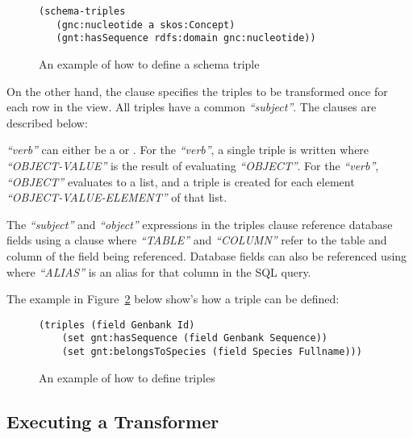 \begin{figure}[H]
\centering
\begin{verbatim}
(schema-triples
   (gnc:nucleotide a skos:Concept)
   (gnt:hasSequence rdfs:domain gnc:nucleotide))
\end{verbatim}
\caption{An example of how to define a schema triple}\label{code:schema-triples-example}
\end{figure}

On the other hand, the  clause specifies the triples to be transformed once for each row in the view.  All triples have a common \textit{``subject''}.  The  clauses are described below:

\textit{``verb''} can either be a  or .  For the  \textit{``verb''}, a single triple  is written where \textit{``OBJECT-VALUE''} is the result of evaluating \textit{``OBJECT''}.  For the  \textit{``verb''}, \textit{``OBJECT''} evaluates to a list, and a triple  is created for each element \textit{``OBJECT-VALUE-ELEMENT''} of that list.

The \textit{``subject''} and \textit{``object''} expressions in the triples clause reference database fields using a  clause where \textit{``TABLE''} and \textit{``COLUMN''} refer to the table and column of the field being referenced.  Database fields can also be referenced using  where \textit{``ALIAS''} is an alias for that column in the SQL query.

The example in Figure~\ref{code:triples-example} below show's how a triple can be defined:

\begin{figure}[H]
\centering
\begin{verbatim}
(triples (field Genbank Id)
    (set gnt:hasSequence (field Genbank Sequence))
    (set gnt:belongsToSpecies (field Species Fullname)))
\end{verbatim}
\caption{An example of how to define triples}\label{code:triples-example}
\end{figure}

\subsection{Executing a Transformer}

